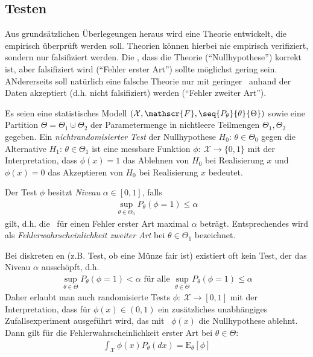 \documentclass[a4paper]{scrartcl}
\begin{document}
	\subsection{Testen}
		
		\begin{motivation}[Erkenntnistheorie]
			Aus grundsätzlichen Überlegeungen heraus wird eine Theorie entwickelt, die empirisch überprüft werden soll. Theorien können hierbei nie empirisch verifiziert, sondern nur falsifiziert werden. Die \Wk, dass die Theorie ("`Nullhypothese"') korrekt ist, aber falsifiziert wird ("`Fehler erster Art"') sollte möglichst gering sein. ANdererseits soll natürlich eine falsche Theorie nur mit geringer \Wk~anhand der Daten akzeptiert (d.h. nicht falsifiziert) werden ("`Fehler zweiter Art"').
		\end{motivation}
		\begin{definition}
			Es seien eine statistisches Modell $\left(\mathcal{X},\mathscr{F},\seq{P_\theta}{\theta}{\Theta}\right)$ sowie eine Partition $\Theta=\Theta_1\cupdot\Theta_2$ der Parametermenge in nichtleere Teilmengen $\Theta_1,\Theta_2$ gegeben. Ein \emph{nichtrandomisierter Test} der Nullhypothese $H_0$: $\theta\in\Theta_0$ gegen die Alternative $H_1$: $\theta\in\Theta_1$ ist eine messbare Funktion $\phi\colon~\mathcal{X}\to\{0,1\}$ mit der Interpretation, dass $\phi(x)=1$ das Ablehnen von $H_0$ bei Realisierung $x$ und $\phi(x)=0$ das Akzeptieren von $H_0$ bei Realisierung $x$ bedeutet.
			
			Der Test $\phi$ besitzt \emph{Niveau} $\alpha\in[0,1]$, falls
			\begin{align*}
				\sup_{\theta\in\Theta_0}P_\theta (\phi=1)\le\alpha
			\end{align*}
			gilt, d.h. die \Wk~für einen Fehler erster Art maximal $\alpha$ beträgt. Entsprechendes wird als \emph{Fehlerwahrscheinlichkeit zweiter Art} bei $\theta\in\Theta_1$ bezeichnet.
		\end{definition}
		\begin{remark}
			Bei diskreten \Wk en (z.B. Test, ob eine Münze fair ist) existiert oft kein Test, der das Niveau $\alpha$ ausschöpft, d.h.
			\begin{align*}
				\sup_{\theta\in\Theta}P_\theta(\phi=1)<\alpha\text{ für alle }\sup_{\theta\in\Theta}P_\theta(\phi=1)\le\alpha
			\end{align*}
			Daher erlaubt man auch randomisierte Tests $\phi\colon~\mathcal{X}\to[0,1]$ mit der Interpretation, dass für $\phi(x)\in(0,1)$ ein zusätzliches unabhängiges Zufallsexperiment ausgeführt wird, das mit \Wk~$\phi(x)$ die Nullhypothese ablehnt. Dann gilt für die Fehlerwahrscheinlichkeit erster Art bei $\theta\in\Theta$:
			\begin{align*}
				\int_\mathcal{X}\phi(x)P_\theta(dx)=\mathrm{E}_\theta[\phi]
			\end{align*}
		\end{remark}
\end{document}
